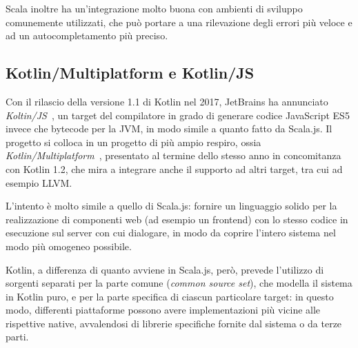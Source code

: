       Scala inoltre ha un'integrazione molto buona con ambienti di sviluppo comunemente utilizzati, che può portare a una rilevazione degli errori più veloce e ad un autocompletamento più preciso.

    \subsection{Kotlin/Multiplatform e Kotlin/JS}\label{subsec:kotlinjs}
      Con il rilascio della versione 1.1 di Kotlin nel 2017, JetBrains ha annunciato \emph{Koltin/JS}~\cite{Belov2017}, un target del compilatore in grado di generare codice JavaScript ES5 invece che bytecode per la JVM, in modo simile a quanto fatto da Scala.js.
      Il progetto si colloca in un progetto di più ampio respiro, ossia \emph{Kotlin/Multiplatform}~\cite{Jemerov2017}, presentato al termine dello stesso anno in concomitanza con Kotlin 1.2, che mira a integrare anche il supporto ad altri target, tra cui ad esempio LLVM\@.

      L'intento è molto simile a quello di Scala.js:
      fornire un linguaggio solido per la realizzazione di componenti web (ad esempio un frontend) con lo stesso codice in esecuzione sul server con cui dialogare, in modo da coprire l'intero sistema nel modo più omogeneo possibile.

      Kotlin, a differenza di quanto avviene in Scala.js, però, prevede l'utilizzo di sorgenti separati per la parte comune (\emph{common source set}), che modella il sistema in Kotlin puro, e per la parte specifica di ciascun particolare target:
      in questo modo, differenti piattaforme possono avere implementazioni più vicine alle rispettive native, avvalendosi di librerie specifiche fornite dal sistema o da terze parti.

